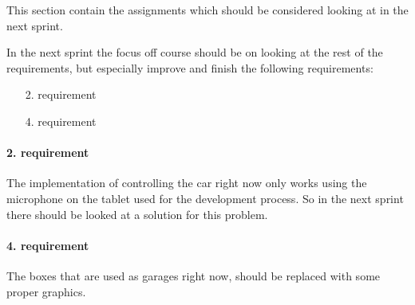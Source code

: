 This section contain the assignments which should be considered looking at in the next sprint.

In the next sprint the focus off course should be on looking at the rest of the requirements, but especially improve and finish the following requirements:
\begin{itemize}
\item[2.] requirement
\item[4.] requirement
\end{itemize}
\paragraph{2. requirement}
The implementation of controlling the car right now only works using the microphone on the tablet used for the development process.
So in the next sprint there should be looked at a solution for this problem.
\paragraph{4. requirement}
The boxes that are used as garages right now, should be replaced with some proper graphics.